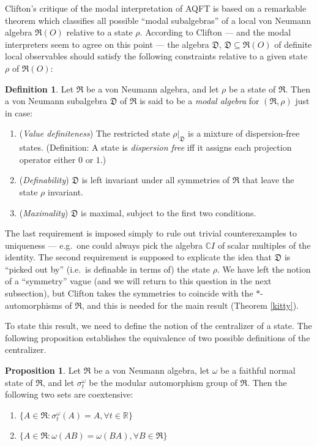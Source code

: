 \documentclass[11pt]{article}
\newcommand{\alg}[1]{\mathfrak{#1}}
\theoremstyle{definition}
\newtheorem{prop}[thm]{Proposition}
\theoremstyle{definition}
\newtheorem{defn}[thm]{Definition}
\theoremstyle{remark}
\def\7#1{{\mathbb #1}}
\def\om{\omega} \def\Om{\Omega} \def\dd{\partial} \def\D{\Delta}
\begin{document}
Clifton's critique of the modal interpretation of AQFT is based on a
remarkable theorem which classifies all possible ``modal subalgebras''
of a local von Neumann algebra $\alg{R}(O)$ relative to a state
$\rho$.  According to Clifton --- and the modal interpreters seem to
agree on this point --- the algebra $\alg{D}$, $\alg{D}\subseteq
\alg{R}(O)$ of definite local observables should satisfy the following
constraints relative to a given state $\rho$ of $\alg{R}(O)$:

\begin{defn} Let $\alg{R}$ be a von Neumann algebra, and let $\rho$ be
  a state of $\alg{R}$.  Then a von Neumann subalgebra $\alg{D}$ of
  $\alg{R}$ is said to be a \emph{modal algebra} for $(\alg{R},\rho )$
  just in case:
  \begin{enumerate}
  \item (\emph{Value definiteness}) The restricted state $\rho
    |_{\alg{D}}$ is a mixture of dispersion-free states.  (Definition:
    A state is \emph{dispersion free} iff it assigns each projection
    operator either $0$ or $1$.)
  \item (\emph{Definability}) $\alg{D}$ is left invariant under all
    symmetries of $\alg{R}$ that leave the state $\rho$ invariant.
  \item (\emph{Maximality}) $\alg{D}$ is maximal, subject to the first
    two conditions.
  \end{enumerate} \label{modal-alg}
\end{defn}

The last requirement is imposed simply to rule out trivial
counterexamples to uniqueness --- e.g.\ one could always pick the
algebra $\7C I$ of scalar multiples of the identity.  The second
requirement is supposed to explicate the idea that $\alg{D}$ is
``picked out by'' (i.e.\ is definable in terms of) the state $\rho$.
We have left the notion of a ``symmetry'' vague (and we will return to
this question in the next subsection), but Clifton takes the
symmetries to coincide with the $*$-automorphisms of $\alg{R}$, and
this is needed for the main result (Theorem \ref{kitty}).

To state this result, we need to define the notion of the centralizer
of a state.  The following proposition establishes the equivalence of
two possible definitions of the centralizer.

\begin{prop} Let $\alg{R}$ be a von Neumann algebra, let $\om$ be a
  faithful normal state of $\alg{R}$, and let $\sigma _t^\om$ be the
  modular automorphism group of $\alg{R}$.  Then the following two
  sets are coextensive:
  \begin{enumerate}
  \item $\{ A\in \alg{R}:\sigma _t^{\om}(A)=A, \forall t\in \7R \}$
  \item $\{ A\in \alg{R}:\om (AB)=\om (BA), \forall B\in \alg{R} \}$
  \end{enumerate} \label{cent}
\end{prop}
\end{document}
